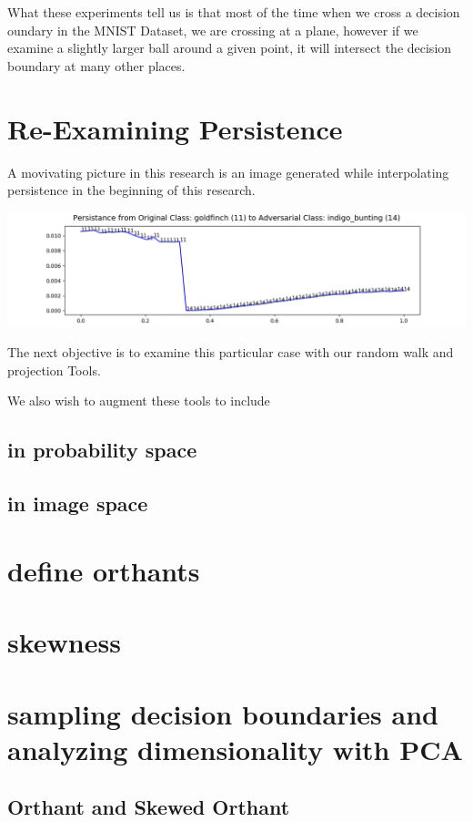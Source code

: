 \documentclass[10pt]{extarticle}
\begin{document}
What these experiments tell us is that most of the time when we cross a decision oundary in the MNIST Dataset, we are crossing at a plane, however if we examine a slightly larger ball around a given point, it will intersect the decision boundary at many other places. 

\section{Re-Examining Persistence}

A movivating picture in this research is an image generated while interpolating persistence in the beginning of this research. 

\includegraphics[width=15cm]{img/persistence_interpolation-IMNET-class-11-vgg16-BIM-48-attack_data-001 (2).png}

The next objective is to examine this particular case with our random walk and projection Tools. 

We also wish to augment these tools to include 


\subsection{in probability space}
\subsection{in image space}
\section{define orthants}
\section{skewness}

\section{sampling decision boundaries and analyzing dimensionality
with PCA}
\subsection{Orthant and Skewed Orthant}
\end{document}

